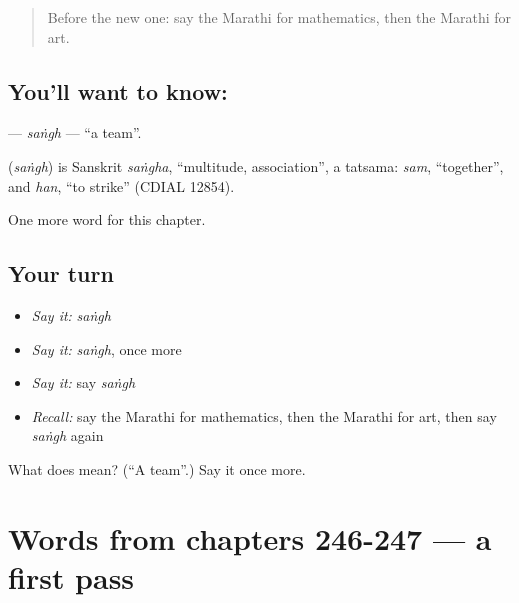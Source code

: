 \label{lesson:MR-C250-sangh}



\begin{quote}
Before the new one: say the Marathi for mathematics, then the Marathi for art.
\end{quote}

\subsection*{You'll want to know: }
\textbf{} — \emph{saṅgh} — \textquotedblleft{}a team\textquotedblright{}.

\begin{cousinweb}
\textbf{} (\emph{saṅgh}) is Sanskrit \emph{saṅgha}, \textquotedblleft{}multitude, association\textquotedblright{}, a tatsama: \emph{sam}, \textquotedblleft{}together\textquotedblright{}, and \emph{han}, \textquotedblleft{}to strike\textquotedblright{} (CDIAL 12854).
\end{cousinweb}

\begin{grammarlens}[title={What you've built}]
One more word for this chapter.
\end{grammarlens}

\subsection*{Your turn}
\begin{itemize}
\raggedright
  \item \emph{Say it:} \emph{saṅgh}
  \item \emph{Say it:} \emph{saṅgh}, once more
  \item \emph{Say it:} say \emph{saṅgh}
  \item \emph{Recall:} say the Marathi for mathematics, then the Marathi for art, then say \emph{saṅgh} again
\end{itemize}

\begin{tcolorbox}[breakable,colback=teal!4,colframe=teal!35!black,title={Before you move on}]
What does  mean? (\textquotedblleft{}A team\textquotedblright{}.) Say it once more.
\end{tcolorbox}
\section[(dialogue)]{Words from chapters 246-247 — a first pass}


